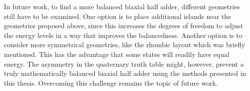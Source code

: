 \documentclass[11pt,a4paper,english,twoside]{article}
\begin{document}
In future work, to find a more balanced biaxial half adder, different geometries still have to be examined. One option is to place additional islands near the geometries proposed above, since this increases the degrees of freedom to adjust the energy levels in a way that improves the balancedness. Another option is to consider more symmetrical geometries, like the rhombic layout which was briefly mentioned. This has the advantage that some states will readily have equal energy. The asymmetry in the quaternary truth table might, however, prevent a truly mathematically balanced biaxial half adder using the methods presented in this thesis. Overcoming this challenge remains the topic of future work.


\newpage



\cleardoublepage
\shipout\null %

\end{document}
